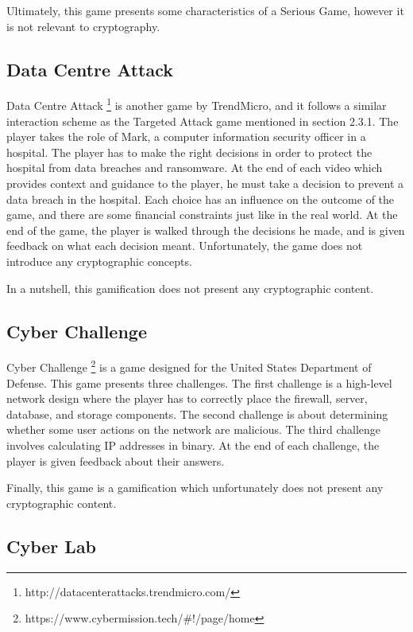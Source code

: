 \documentclass{l4proj}
\begin{document}
Ultimately, this game presents some characteristics of a Serious Game, however it is not relevant to cryptography.

\subsection{Data Centre Attack}

Data Centre Attack \footnote{http://datacenterattacks.trendmicro.com/} is another game by TrendMicro, 
and it follows a similar interaction scheme as the Targeted Attack game mentioned in section 2.3.1.
The player takes the role of Mark, a computer information security officer in a hospital. 
The player has to make the right decisions in order to protect the hospital from data breaches and ransomware.
At the end of each video which provides context and guidance to the player, he must take a decision to prevent a data breach in the hospital.
Each choice has an influence on the outcome of the game, and there are some financial constraints just like in the real world.
At the end of the game, the player is walked through the decisions he made, and is given feedback on what each decision meant.
Unfortunately, the game does not introduce any cryptographic concepts.

In a nutshell, this gamification does not present any cryptographic content.

\subsection{Cyber Challenge}

Cyber Challenge \footnote{https://www.cybermission.tech/\#!/page/home} is a game designed for the United States Department of Defense. 
This game presents three challenges.
The first challenge is a high-level network design where the player has to correctly place the firewall, server, database, and storage components.
The second challenge is about determining whether some user actions on the network are malicious.
The third challenge involves calculating IP addresses in binary. 
At the end of each challenge, the player is given feedback about their answers.

Finally, this game is a gamification which unfortunately does not present any cryptographic content.


\subsection{Cyber Lab}
\end{document}
